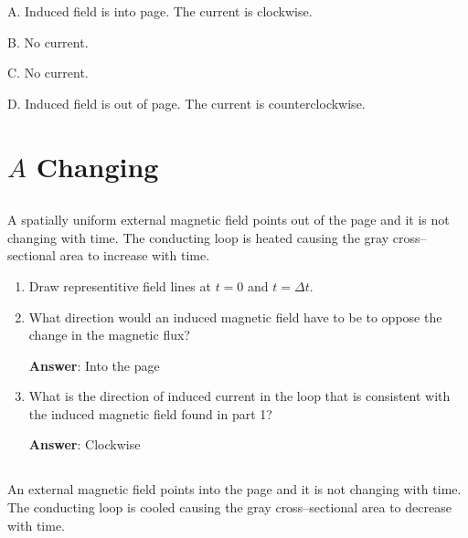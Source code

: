 \documentclass{article}
\begin{document}
A. Induced field is into page. The current is clockwise.

B. No current.

C. No current.

D. Induced field is out of page. The current is counterclockwise.
\else

\newpage
\fi

\section{$A$ Changing}

\subsection{}

A spatially uniform external magnetic field points out of the page and it is not changing with time. The conducting loop is heated causing the gray cross--sectional area to increase with time.

\begin{enumerate}

  \item Draw representitive field lines at $t=0$ and $t=\Delta t$.

        \ifsolutions

        \else

        
        \fi

  \item What direction would an induced magnetic field have to be to oppose the change in the magnetic flux?

        \ifsolutions
        {\bf Answer}: Into the page
        \else

        \fi

  \item What is the direction of induced current in the loop that is consistent with the induced magnetic field found in part 1?

        \ifsolutions
        {\bf Answer}: Clockwise
        \else

        \fi

\end{enumerate}

\subsection{}

An external magnetic field points into the page and it is not changing with time. The conducting loop is cooled causing the gray cross--sectional area to decrease with time.
\end{document}
